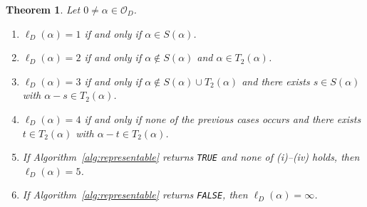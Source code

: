 \documentclass[manuscript,screen]{acmart}
\theoremstyle{plain}
\newtheorem{theorem}{Theorem}[section]
\theoremstyle{definition}
\theoremstyle{nonitalicremark}
\newcommand{\OD}{\mathcal{O}_D}
\newcommand{\len}{\ell}
\begin{document}
\begin{theorem}\label{thm:criterion}
Let $0 \neq \alpha \in \OD$.
\begin{enumerate}[label=\textup{(\roman*)},itemsep=0.3em]
\item $\len_D(\alpha)=1$ if and only if $\alpha\in S(\alpha)$.
\item $\len_D(\alpha)=2$ if and only if $\alpha\notin S(\alpha)$ and
$\alpha\in T_2(\alpha)$.
\item $\len_D(\alpha)=3$ if and only if
$\alpha\notin S(\alpha)\cup T_2(\alpha)$ and there exists $s\in S(\alpha)$ with
$\alpha-s \in T_2(\alpha)$.
\item $\len_D(\alpha)=4$ if and only if none of the previous cases occurs and there exists
$t \in T_2(\alpha)$ with $\alpha-t \in T_2(\alpha)$.
\item If Algorithm~\ref{alg:representable} returns \texttt{TRUE} and none of
\textup{(i)}--\textup{(iv)} holds, then $\len_D(\alpha)=5$.
\item If Algorithm~\ref{alg:representable} returns \texttt{FALSE}, then
$\len_D(\alpha)=\infty$.
\end{enumerate}
\end{theorem}
\end{document}
